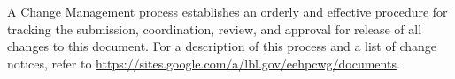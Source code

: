 
\noindent
A Change Management process establishes an orderly and effective procedure for tracking the submission, coordination, review, and approval for release of all changes to this document. For a description of this process and a list of change notices, refer to 
\url{https://sites.google.com/a/lbl.gov/eehpcwg/documents}.
